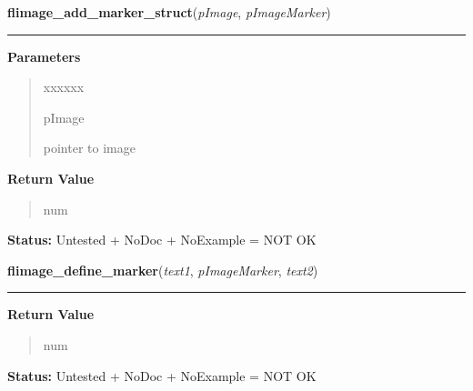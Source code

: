 \hspace{.8\funcindent}\begin{boxedminipage}{\funcwidth}

    \raggedright \textbf{flimage\_add\_marker\_struct}(\textit{pImage}, \textit{pImageMarker})

    \vspace{-1.5ex}

    \rule{\textwidth}{0.5\fboxrule}
\setlength{\parskip}{2ex}
\setlength{\parskip}{1ex}
      \textbf{Parameters}
      \vspace{-1ex}

      \begin{quote}
        \begin{Ventry}{xxxxxx}

          \item[pImage]

          pointer to image

        \end{Ventry}

      \end{quote}

      \textbf{Return Value}
    \vspace{-1ex}

      \begin{quote}
      num

      \end{quote}

\textbf{Status:} Untested + NoDoc + NoExample = NOT OK



    \end{boxedminipage}

    \label{xformslib:library:flimage_define_marker}

    \vspace{0.5ex}

\hspace{.8\funcindent}\begin{boxedminipage}{\funcwidth}

    \raggedright \textbf{flimage\_define\_marker}(\textit{text1}, \textit{pImageMarker}, \textit{text2})

    \vspace{-1.5ex}

    \rule{\textwidth}{0.5\fboxrule}
\setlength{\parskip}{2ex}
\setlength{\parskip}{1ex}
      \textbf{Return Value}
    \vspace{-1ex}

      \begin{quote}
      num

      \end{quote}

\textbf{Status:} Untested + NoDoc + NoExample = NOT OK



    \end{boxedminipage}

